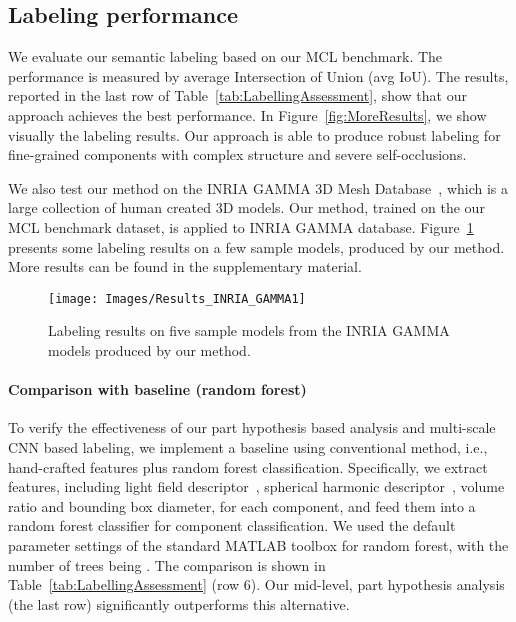 \documentclass[acmtog]{acmart}
\newcommand{\new}[1]{{\color{black}#1}}
\begin{document}
\subsection{Labeling performance}
\label{subsec:label}
\new{
We evaluate our semantic labeling based on our MCL benchmark.
The performance is measured by average Intersection of Union (avg IoU).
The results, reported in the last row of Table~\ref{tab:LabellingAssessment},
show that our approach achieves the best performance.
In Figure~\ref{fig:MoreResults}, we show visually the labeling results.
Our approach is able to produce robust labeling for fine-grained components with
complex structure and severe self-occlusions.

We also test our method on the INRIA GAMMA 3D Mesh Database~\citep{GAMMA}, which is a large collection of human created 3D models. Our method, trained on the our MCL benchmark dataset, is applied to INRIA GAMMA database.
Figure~\ref{fig:GAMMA_database} presents some labeling results on a few sample models, produced by our method.
More results can be found in the supplementary material.



\begin{figure}[t]
  \centering
  \texttt{[image: Images/Results\_INRIA\_GAMMA1]}
  \caption{\new{Labeling results on five sample models from the INRIA GAMMA models produced by our method.}}
  \label{fig:GAMMA_database}
\end{figure}

\paragraph{\textbf{Comparison with baseline (random forest)}}
To verify the effectiveness of our part hypothesis based analysis and multi-scale CNN based labeling,
we implement a baseline using conventional method, i.e., hand-crafted features plus random forest classification. Specifically, we extract features, including light field descriptor~\cite{Chen2010On}, spherical harmonic descriptor~\cite{Kazhdan2003Rotation}, volume ratio and bounding box diameter, for each component,
and feed them into a random forest classifier for component classification.
We used the default parameter settings of the standard MATLAB toolbox for random forest,
with the number of trees being .
The comparison is shown in Table~\ref{tab:LabellingAssessment} (row 6).
Our mid-level, part hypothesis analysis (the last row) significantly outperforms this alternative.

}
\end{document}
